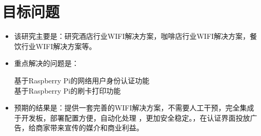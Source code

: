 \chapter{目标问题}

\begin{itemize}
\item 该研究主要是：研究酒店行业WIFI解决方案，咖啡店行业WIFI解决方案，餐饮行业WIFI解决方案等。
\item 重点解决的问题是：
  \begin{description}
  \item[基于Raspberry Pi的网络用户身份认证功能]
  \item[基于Raspberry Pi的刷卡打印功能]
  \end{description}
\item 预期的结果是：提供一套完善的WIFI解决方案，不需要人工干预，完全集成于开发板，部署配置方便，自动化处理
，更加安全稳定。，在认证界面投放广告，给商家带来宣传的媒介和商业利益。

\end{itemize}

